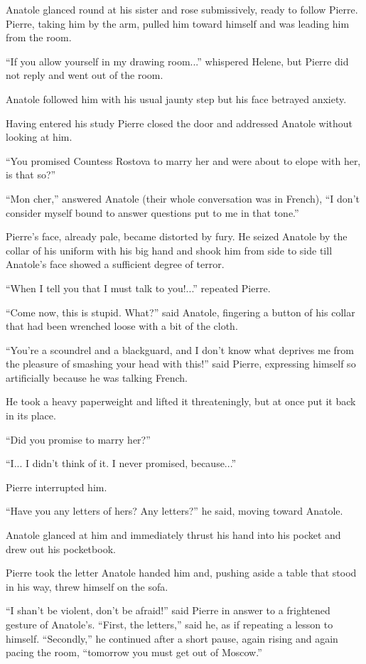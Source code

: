 Anatole glanced round at his sister and rose submissively, ready
to follow Pierre. Pierre, taking him by the arm, pulled him
toward himself and was leading him from the room.

``If you allow yourself in my drawing room...'' whispered Helene,
but Pierre did not reply and went out of the room.

Anatole followed him with his usual jaunty step but his face
betrayed anxiety.

Having entered his study Pierre closed the door and addressed
Anatole without looking at him.

``You promised Countess Rostova to marry her and were about to
elope with her, is that so?''

``Mon cher,'' answered Anatole (their whole conversation was in
French), ``I don't consider myself bound to answer questions put
to me in that tone.''

Pierre's face, already pale, became distorted by fury. He seized
Anatole by the collar of his uniform with his big hand and shook
him from side to side till Anatole's face showed a sufficient
degree of terror.

``When I tell you that I must talk to you!...'' repeated Pierre.

``Come now, this is stupid. What?'' said Anatole, fingering a
button of his collar that had been wrenched loose with a bit of
the cloth.

``You're a scoundrel and a blackguard, and I don't know what
deprives me from the pleasure of smashing your head with this!''
said Pierre, expressing himself so artificially because he was
talking French.

He took a heavy paperweight and lifted it threateningly, but at
once put it back in its place.

``Did you promise to marry her?''

``I... I didn't think of it. I never promised, because...''

Pierre interrupted him.

``Have you any letters of hers? Any letters?'' he said, moving
toward Anatole.

Anatole glanced at him and immediately thrust his hand into his
pocket and drew out his pocketbook.

Pierre took the letter Anatole handed him and, pushing aside a
table that stood in his way, threw himself on the sofa.

``I shan't be violent, don't be afraid!'' said Pierre in answer
to a frightened gesture of Anatole's. ``First, the letters,''
said he, as if repeating a lesson to himself. ``Secondly,'' he
continued after a short pause, again rising and again pacing the
room, ``tomorrow you must get out of Moscow.''

